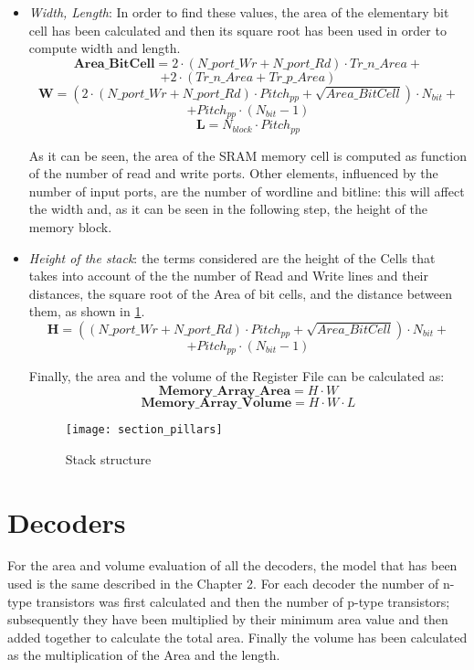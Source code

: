 \begin{itemize}
	\item \textit{Width, Length}: In order to find these values, the area of the elementary bit cell has been calculated and then its square root has been used in order to compute width and length.
	\[
	\textbf{Area\_BitCell}=2 \cdot (N\_port\_Wr+N\_port\_Rd) \cdot Tr\_n\_Area +
	\]
	\[
	+ 2 \cdot (Tr\_n\_Area + Tr\_p\_Area)
	\]
	\[
	\textbf{W}=(2 \cdot (N\_port\_Wr + N\_port\_Rd) \cdot Pitch_{pp} + \sqrt{Area\_BitCell}) \cdot N_{bit} +
	\]
	\[
	+ Pitch_{pp} \cdot (N_{bit}-1)
	\]
	\[
	\textbf{L}=N_{block} \cdot Pitch_{pp}
	\]
	
	As it can be seen, the area of the SRAM memory cell is computed as function of the number of read and write ports. Other elements, influenced by the number of input ports, are the number of wordline and bitline: this will affect the width and, as it can be seen in the following step, the height of the memory block.
	
	\item \textit{Height of the stack}: the terms considered are the height of the Cells that takes into account of the the number of Read and Write lines and their distances, the square root of the Area of bit cells, and the distance between them, as shown in \ref{fig:Stack}.
	\[
	\textbf{H}=((N\_port\_Wr+N\_port\_Rd) \cdot Pitch_{pp} + \sqrt{Area\_BitCell}) \cdot N_{bit} +
	\]
	\[
	+ Pitch_{pp} \cdot (N_{bit}-1)	
	\]
	
Finally, the area and the volume of the Register File can be calculated as:
	\[
	\textbf{Memory\_Array\_Area}=H \cdot W
	\]
	\[
	\textbf{Memory\_Array\_Volume}=H \cdot W \cdot L
	\]
	
\begin{center}
	\begin{figure}[H]
		\centering
		\texttt{[image: section\_pillars]}
		\caption{Stack structure}
		\label{fig:Stack}
	\end{figure}
\end{center}
\end{itemize}

\section{Decoders}
For the area and volume evaluation of all the decoders, the model that has been used is the same described in the Chapter 2. For each decoder the number of n-type transistors was first calculated and then the number of p-type transistors; subsequently they have been multiplied by their minimum area value and then added together to calculate the total area. Finally the volume has been calculated as the multiplication of the Area and the length.

